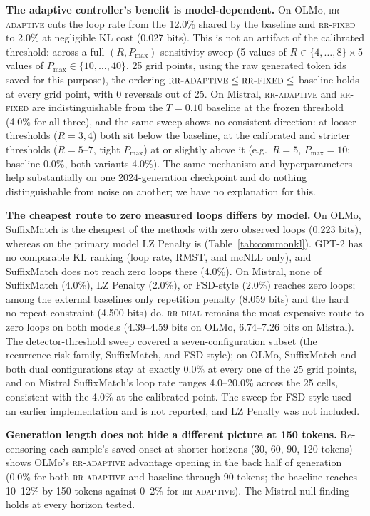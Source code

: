 \documentclass[11pt]{article}
\begin{document}
\textbf{The adaptive controller's benefit is model-dependent.} On OLMo, \textsc{rr-adaptive} cuts the loop rate from the 12.0\% shared by the baseline and \textsc{rr-fixed} to 2.0\% at negligible KL cost (0.027 bits). This is not an artifact of the calibrated threshold: across a full $(R,P_{\max})$ sensitivity sweep (5 values of $R\in\{4,\ldots,8\}\times5$ values of $P_{\max}\in\{10,\ldots,40\}$, 25 grid points, using the raw generated token ids saved for this purpose), the ordering $\textsc{rr-adaptive}\le\textsc{rr-fixed}\le$ baseline holds at every grid point, with 0 reversals out of 25. On Mistral, \textsc{rr-adaptive} and \textsc{rr-fixed} are indistinguishable from the $T{=}0.10$ baseline at the frozen threshold (4.0\% for all three), and the same sweep shows no consistent direction: at looser thresholds ($R{=}3,4$) both sit below the baseline, at the calibrated and stricter thresholds ($R{=}5$--$7$, tight $P_{\max}$) at or slightly above it (e.g.\ $R{=}5$, $P_{\max}{=}10$: baseline 0.0\%, both variants 4.0\%). The same mechanism and hyperparameters help substantially on one 2024-generation checkpoint and do nothing distinguishable from noise on another; we have no explanation for this.

\textbf{The cheapest route to zero measured loops differs by model.} On OLMo, SuffixMatch is the cheapest of the methods with zero observed loops (0.223 bits), whereas on the primary model LZ Penalty is (Table~\ref{tab:commonkl}). GPT-2 has no comparable KL ranking (loop rate, RMST, and mcNLL only), and SuffixMatch does not reach zero loops there (4.0\%). On Mistral, none of SuffixMatch (4.0\%), LZ Penalty (2.0\%), or FSD-style (2.0\%) reaches zero loops; among the external baselines only repetition penalty (8.059 bits) and the hard no-repeat constraint (4.500 bits) do. \textsc{rr-dual} remains the most expensive route to zero loops on both models (4.39--4.59 bits on OLMo, 6.74--7.26 bits on Mistral). The detector-threshold sweep covered a seven-configuration subset (the recurrence-risk family, SuffixMatch, and FSD-style); on OLMo, SuffixMatch and both dual configurations stay at exactly 0.0\% at every one of the 25 grid points, and on Mistral SuffixMatch's loop rate ranges 4.0--20.0\% across the 25 cells, consistent with the 4.0\% at the calibrated point. The sweep for FSD-style used an earlier implementation and is not reported, and LZ Penalty was not included.

\textbf{Generation length does not hide a different picture at 150 tokens.} Re-censoring each sample's saved onset at shorter horizons (30, 60, 90, 120 tokens) shows OLMo's \textsc{rr-adaptive} advantage opening in the back half of generation (0.0\% for both \textsc{rr-adaptive} and baseline through 90 tokens; the baseline reaches 10--12\% by 150 tokens against 0--2\% for \textsc{rr-adaptive}). The Mistral null finding holds at every horizon tested.
\end{document}
